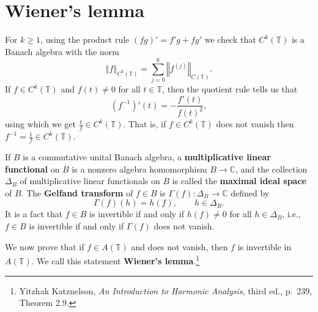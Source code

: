 \documentclass{article}
\newcommand{\norm}[1]{\left\Vert #1 \right\Vert}
\theoremstyle{definition}
\begin{document}
\section{Wiener's lemma}
For $k \geq 1$, 
using the product rule $(fg)'=f'g+fg'$ we check that $C^k(\mathbb{T})$ is a Banach algebra with the norm
\[
\norm{f}_{C^k(\mathbb{T})} = \sum_{j=0}^k \norm{f^{(j)}}_{C(\mathbb{T})}.
\]
If $f \in C^k(\mathbb{T})$ and $f(t) \neq 0$ for all $t \in \mathbb{T}$, then the quotient rule tells us that
\[
\left(f^{-1} \right)'(t)  = -\frac{f'(t)}{f(t)^2},
\]
using which we get $\frac{1}{f} \in C^k(\mathbb{T})$. That is, if $f \in C^k(\mathbb{T})$ does not vanish then
$f^{-1}=\frac{1}{f} \in C^k(\mathbb{T})$.

If $B$ is a commutative unital Banach algebra, a \textbf{multiplicative linear functional} on
$B$ is a nonzero algebra homomorphism $B \to \mathbb{C}$, and the collection $\Delta_B$
of multiplicative
linear functionals on $B$ is called the \textbf{maximal ideal space} of $B$. 
The \textbf{Gelfand transform}  of $f \in B$ is $\Gamma(f):\Delta_B \to \mathbb{C}$ defined by
\[
\Gamma(f)(h) = h(f), \qquad h \in \Delta_B.
\] 
It is a fact that $f \in B$ is invertible if and only if $h(f) \neq 0$ for all $h \in \Delta_B$, i.e.,
$f \in B$ is invertible if and only if $\Gamma(f)$ does not vanish.

We now prove that if $f \in A(\mathbb{T})$ and does not vanish, then $f$ is invertible in $A(\mathbb{T})$. We call this statement \textbf{Wiener's
lemma}.\footnote{Yitzhak Katznelson, {\em An Introduction to Harmonic Analysis}, third ed., p.~239, Theorem 2.9.}
\end{document}
